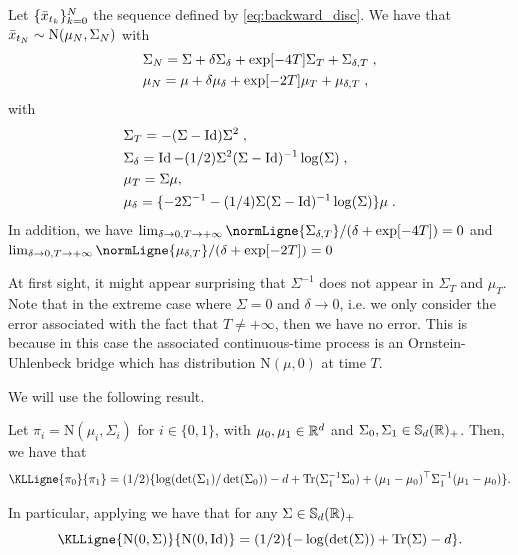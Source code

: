 \begin{corollary}
  \label{sec:conv-results-discr-1}
  Let $\{\bar{x}_{t_k}\}_{k=0}^N$ the sequence defined by
  \eqref{eq:backward_disc}. We have that
  $\bar{x}_{t_N} \sim \mathrm{N}(\mu_N, \Sigma_N)$ with
  \begin{align}
    &\Sigma_N = \Sigma + \delta \Sigma_\delta + \exp[-4T] \Sigma_T + \Sigma_{\delta, T} \; , \\
    &\mu_N = \mu + \delta \mu_\delta + \exp[-2T] \mu_T + \mu_{\delta, T} \; ,
  \end{align}
  with
  \begin{align}
    & \Sigma_T = - (\Sigma - \operatorname{Id})\Sigma^2 \; , \\
    & \Sigma_\delta = \operatorname{Id} - (1/2)\Sigma^2 (\Sigma - \operatorname{Id})^{-1} \log(\Sigma) \; , \\    
    & \mu_T = \Sigma \mu  , \\
    & \mu_\delta = \{-2 \Sigma^{-1}-  (1/4) \Sigma (\Sigma - \operatorname{Id})^{-1} \log(\Sigma)\} \mu  \; . 
  \end{align}
  In addition, we have
  $\lim_{\delta \to 0, T \to +\infty} \normLigne{\Sigma_{\delta, T}}/(\delta +
  \exp[-4T]) = 0$ and
  $\lim_{\delta \to 0, T \to +\infty} \normLigne{\mu_{\delta, T}}/(\delta +
  \exp[-2T]) = 0$
\end{corollary}

At first sight, it might appear surprising that $\Sigma^{-1}$ does not appear in
${\Sigma}_T$ and ${\mu}_T$. Note that in the extreme case where
$\Sigma =0$ and $\delta \to0$, i.e. we only consider the error associated with
the fact that $T \neq +\infty$, then we have no error. This is because in this
case the associated continuous-time process is an Ornstein-Uhlenbeck bridge which
has distribution $\mathrm{N}(\mu, 0)$ at time $T$.

We will use the following result.

\begin{lemma}
\label{lemma:kl_gaussian}
  Let $\pi_i = \mathrm{N}(\mu_i, \Sigma_i)$ for $i \in \{0,1\}$, with
  $\mu_0, \mu_1 \in \mathbb{R}^d$ and $\Sigma_0, \Sigma_1 \in
  \mathbb{S}_d(\mathbb{R})_+$. Then, we have that 
  \begin{equation}
    \KLLigne{\pi_0}{\pi_1} = (1/2) \{ \log(\det(\Sigma_1)/\det(\Sigma_0)) - d + \mathrm{Tr}(\Sigma_1^{-1}\Sigma_0) + (\mu_1 - \mu_0)^\top \Sigma_1^{-1}(\mu_1 - \mu_0)\} .
  \end{equation}
\end{lemma}

In particular, applying  we have that for any
$\Sigma \in \mathbb{S}_d(\mathbb{R})_+$
\begin{equation}
\label{eq:kl_computation}
  \KLLigne{\mathrm{N}(0, \Sigma)}{\mathrm{N}(0, \Id)} = (1/2)\{-\log(\det(\Sigma)) + \mathrm{Tr}(\Sigma) -d \}.
\end{equation}


